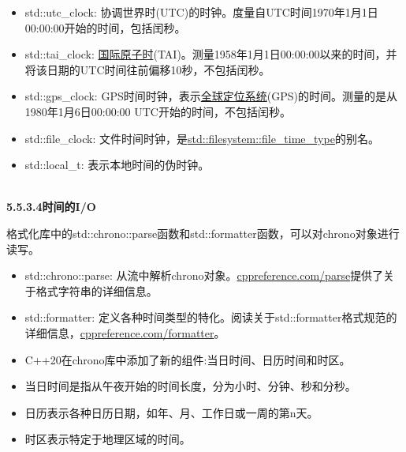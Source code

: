 \begin{itemize}
\item 
std::utc\_clock: 协调世界时(UTC)的时钟。度量自UTC时间1970年1月1日00:00:00开始的时间，包括闰秒。

\item 
std::tai\_clock: \href{https://en.wikipedia.org/wiki/International_Atomic_Time}{国际原子时}(TAI)。测量1958年1月1日00:00:00以来的时间，并将该日期的UTC时间往前偏移10秒，不包括闰秒。

\item 
std::gps\_clock: GPS时间时钟，表示\href{https://en.wikipedia.org/wiki/Global_Positioning_System}{全球定位系统}(GPS)的时间。测量的是从1980年1月6日00:00:00 UTC开始的时间，不包括闰秒。

\item 
std::file\_clock: 文件时间时钟，是\href{https://en.cppreference.com/w/cpp/filesystem/file_time_type}{std::filesystem::file\_time\_type}的别名。

\item 
std::local\_t: 表示本地时间的伪时钟。
\end{itemize}


\hspace*{\fill} \\ %
\noindent
\textbf{5.5.3.4\hspace{0.2cm}时间的I/O}

格式化库中的std::chrono::parse函数和std::formatter函数，可以对chrono对象进行读写。

\begin{itemize}
\item 
std::chrono::parse: 从流中解析chrono对象。\href{https://en.cppreference.com/w/cpp/chrono/parse}{cppreference.com/parse}提供了关于格式字符串的详细信息。

\item 
std::formatter: 定义各种时间类型的特化。阅读关于std::formatter格式规范的详细信息，\href{https://en.cppreference.com/w/cpp/chrono/system_clock/formatter#Format_specification}{cppreference.com/formatter}。
\end{itemize}

\begin{tcolorbox}[breakable,enhanced jigsaw,colback=mygreen!5!white,colframe=mygreen!75!black,title={总结}]

\begin{itemize}
\item 
C++20在chrono库中添加了新的组件:当日时间、日历时间和时区。

\item 
当日时间是指从午夜开始的时间长度，分为小时、分钟、秒和分秒。

\item 
日历表示各种日历日期，如年、月、工作日或一周的第n天。

\item 
时区表示特定于地理区域的时间。
\end{itemize}

\end{tcolorbox}

\newpage






